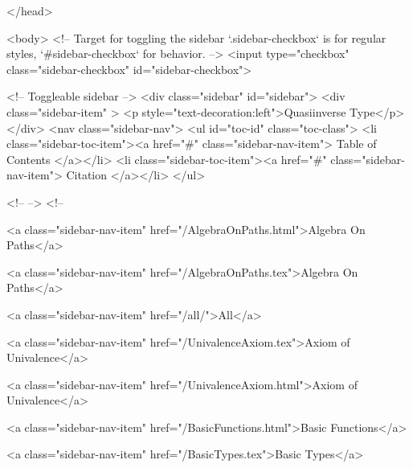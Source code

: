  
</head>




  <body>
    <!-- Target for toggling the sidebar `.sidebar-checkbox` is for regular
     styles, `#sidebar-checkbox` for behavior. -->
<input type="checkbox" class="sidebar-checkbox" id="sidebar-checkbox">

<!-- Toggleable sidebar -->
<div class="sidebar" id="sidebar">
  <div class="sidebar-item" >
    <p style="text-decoration:left">Quasiinverse Type</p>
  </div>
  <nav class="sidebar-nav">
    <ul id="toc-id" class="toc-class">
  <li class="sidebar-toc-item"><a href="#" class="sidebar-nav-item"> Table of Contents </a></li>
  <li class="sidebar-toc-item"><a href="#" class="sidebar-nav-item"> Citation </a></li>
</ul>


    <!--  -->
    <!-- 
      
    
      
    
      
    
      
        
      
    
      
        
          <a class="sidebar-nav-item" href="/AlgebraOnPaths.html">Algebra On Paths</a>
        
      
    
      
        
          <a class="sidebar-nav-item" href="/AlgebraOnPaths.tex">Algebra On Paths</a>
        
      
    
      
        
          <a class="sidebar-nav-item" href="/all/">All</a>
        
      
    
      
        
          <a class="sidebar-nav-item" href="/UnivalenceAxiom.tex">Axiom of Univalence</a>
        
      
    
      
        
          <a class="sidebar-nav-item" href="/UnivalenceAxiom.html">Axiom of Univalence</a>
        
      
    
      
        
          <a class="sidebar-nav-item" href="/BasicFunctions.html">Basic Functions</a>
        
      
    
      
        
          <a class="sidebar-nav-item" href="/BasicTypes.tex">Basic Types</a>
        
